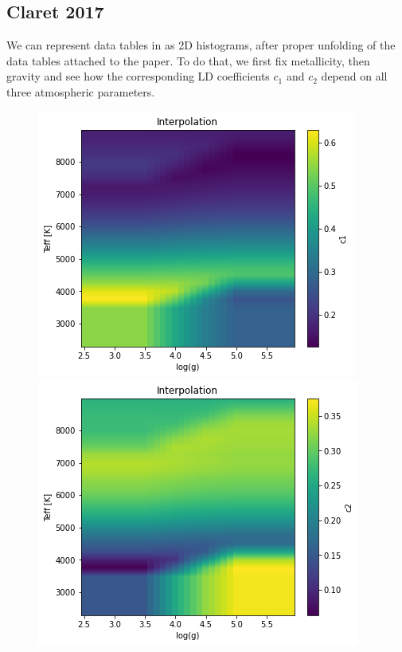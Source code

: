 \documentclass[a4paper,11pt,twocolumn]{article}
\begin{document}
\subsection{Claret 2017}
We can represent data tables in \cite{claret2017} as 2D histograms, 
after proper unfolding of the data tables attached to the paper. To do that, 
we first fix metallicity, then gravity and see how the corresponding LD 
coefficients $c_1$ and $c_2$ depend on all three atmospheric parameters. 
\begin{figure}[H]
    \centering  
    \includegraphics[scale=0.25, angle=0]{../pictures/Claret2017/2017_c1_fixedmet}
    \includegraphics[scale=0.25, angle=0]{../pictures/Claret2017/2017_c2_fixedmet}


\end{figure}
\end{document}
